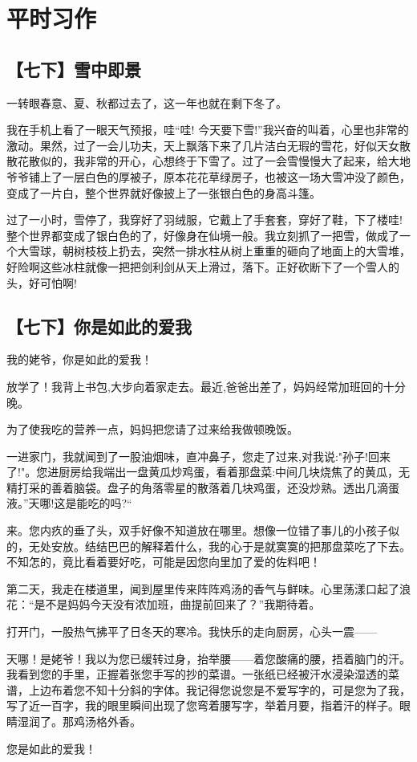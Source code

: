 
\chapter{平时习作}


\section{【七下】雪中即景}


一转眼春意、夏、秋都过去了，这一年也就在剩下冬了。

我在手机上看了一眼天气预报，哇“哇! 今天要下雪!”我兴奋的叫着，心里也非常的激动。果然，过了一会儿功夫，天上飘落下来了几片洁白无瑕的雪花，好似天女散散花散似的，我非常的开心，心想终于下雪了。过了一会雪慢慢大了起来，给大地爷爷铺上了一层白色的厚被子，原本花花草绿房子，也被这一场大雪冲没了颜色，变成了一片白，整个世界就好像披上了一张银白色的身高斗篷。

过了一小时，雪停了，我穿好了羽绒服，它戴上了手套套，穿好了鞋，下了楼哇! 整个世界都变成了银白色的了，好像身在仙境一般。我立刻抓了一把雪，做成了一个大雪球，朝树枝枝上扔去，突然一排水柱从树上重重的砸向了地面上的大雪堆，好险啊这些冰柱就像一把把剑利剑从天上滑过，落下。正好砍断下了一个雪人的头，好可怕啊!


\section{【七下】你是如此的爱我}


我的姥爷，你是如此的爱我！

放学了！我背上书包,大步向着家走去。最近,爸爸出差了，妈妈经常加班回的十分晚。

为了使我吃的营养一点，妈妈把您请了过来给我做顿晚饭。

一进家门，我就闻到了一股油烟味，直冲鼻子，您走了过来,对我说:"孙子!回来了!"。您进厨房给我端出一盘黄瓜炒鸡蛋，看着那盘菜:中间几块烧焦了的黄瓜，无精打采的善着脑袋。盘子的角落零星的散落着几块鸡蛋，还没炒熟。透出几滴蛋液。”天哪!这是能吃的吗?“


来。您内疚的垂了头，双手好像不知道放在哪里。想像一位错了事儿的小孩子似的，无处安放。结结巴巴的解释着什么，我的心于是就寞寞的把那盘菜吃了下去。不知怎的，竟比看着要好吃，可能是因您向里加了爱的佐料吧！

第二天，我走在楼道里，闻到屋里传来阵阵鸡汤的香气与鲜味。心里荡漾口起了浪花：“是不是妈妈今天没有浓加班，曲提前回来了？”我期待着。

打开门，一股热气拂平了日冬天的寒冷。我快乐的走向厨房，心头一震——

天哪！是姥爷！我以为您已缓转过身，抬举腰——着您酸痛的腰，捂着脑门的汗。我看到您的手里，正握着张您手写的抄的菜谱。一张纸已经被汗水浸染湿透的菜谱，上边布着您不知十分斜的字体。我记得您说您是不爱写字的，可是您为了我，写了近一百字，我的眼里瞬间出现了您弯着腰写字，举着月要，指着汗的样子。眼睛湿润了。那鸡汤格外香。

您是如此的爱我！

